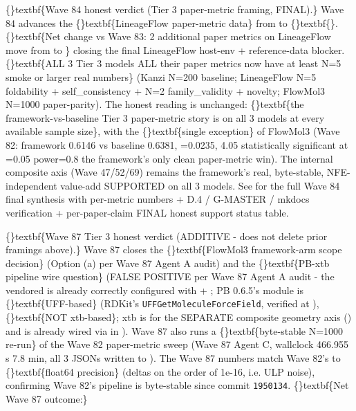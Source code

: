 \documentclass{article}
\begin{document}
\{\}textbf\{Wave 84 honest verdict (Tier 3 paper-metric framing, FINAL).\} Wave 84 advances the \{\}textbf\{LineageFlow paper-metric data\} from  to \{\}textbf\{\}. \{\}textbf\{Net change vs Wave 83: 2 additional paper metrics on LineageFlow move from  to \}  closing the final LineageFlow host-env + reference-data blocker. \{\}textbf\{ALL 3 Tier 3 models  ALL their paper metrics now have at least N=5 smoke or larger real numbers\} (Kanzi N=200 baseline; LineageFlow N=5 foldability + self\_consistency + N=2 family\_validity + novelty; FlowMol3 N=1000 paper-parity). The honest reading is unchanged: \{\}textbf\{the framework-vs-baseline Tier 3 paper-metric story is  on all 3 models at every available sample size\}, with the \{\}textbf\{single exception\} of FlowMol3  (Wave 82: framework 0.6146 vs baseline 0.6381, =0.0235, 4.05 statistically significant at =0.05 power=0.8  the framework's only clean paper-metric win). The internal composite axis (Wave 47/52/69) remains the framework's real, byte-stable, NFE-independent value-add  SUPPORTED on all 3 models. See  for the full Wave 84 final synthesis with per-metric numbers + D.4 / G-MASTER / mkdocs verification + per-paper-claim FINAL honest support status table.

\{\}textbf\{Wave 87 Tier 3 honest verdict (ADDITIVE - does not delete prior framings above).\} Wave 87 closes the \{\}textbf\{FlowMol3 framework-arm scope decision\} (Option (a) per Wave 87 Agent A audit) and the \{\}textbf\{PB-xtb pipeline wire question\} (FALSE POSITIVE per Wave 87 Agent A audit - the vendored  is already correctly configured with  + ; PB 0.6.5's  module is \{\}textbf\{UFF-based\} (RDKit's \texttt{UFFGetMoleculeForceField}, verified at ), \{\}textbf\{NOT xtb-based\}; xtb is for the SEPARATE composite geometry axis () and is already wired via  in ). Wave 87 also runs a \{\}textbf\{byte-stable N=1000 re-run\} of the Wave 82 paper-metric sweep (Wave 87 Agent C, wallclock 466.955 s  7.8 min, all 3 JSONs written to ). The Wave 87 numbers match Wave 82's to \{\}textbf\{float64 precision\} (deltas on the order of 1e-16, i.e. ULP noise), confirming Wave 82's pipeline is byte-stable since commit \texttt{1950134}. \{\}textbf\{Net Wave 87 outcome:\}
\end{document}
